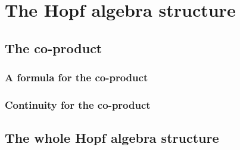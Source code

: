 
%
%

\chapter{The Hopf algebra structure}

\section{The co-product}
\label{sec:chap7_Coproduct}

\subsection{A formula for the co-product}

\subsection{Continuity for the co-product}



\section{The whole Hopf algebra structure}
\label{sec:chap7_HopfAlgebra}